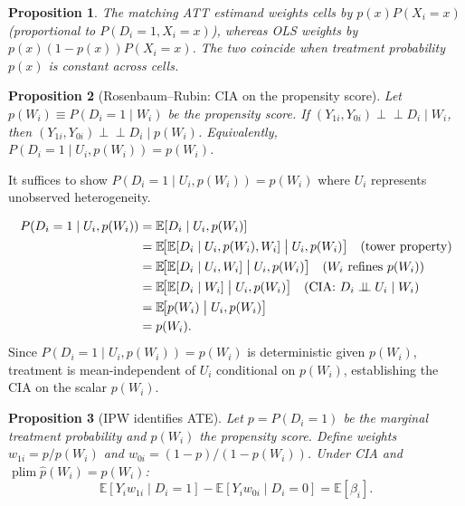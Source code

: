 \documentclass[12pt,a4paper]{article}
\theoremstyle{plain}
\newtheorem{propositio}{Proposition}[section]
\theoremstyle{definition}
\renewenvironment{proof}{\pushQED{\qed}\normalfont}{\popQED\par\nobreak}
\newcommand{\E}{\mathbb{E}}
\newcommand{\plim}{\operatorname{plim}}
\newcommand{\ind}{\perp\!\!\!\perp}
\begin{document}
\begin{propositio}
  The matching ATT estimand weights cells by $p(x)P(X_i=x)$ (proportional to $P(D_i=1,X_i=x)$), whereas OLS weights by $p(x)(1-p(x))P(X_i=x)$.  The two coincide when treatment probability $p(x)$ is constant across cells.
\end{propositio}

\begin{propositio}[Rosenbaum--Rubin: CIA on the propensity score\label{prop:rosenbaum_rubin}]
Let $p(W_i)\equiv P(D_i=1\mid W_i)$ be the propensity score.
If $(Y_{1i},Y_{0i})\ind D_i\mid W_i$, then $(Y_{1i},Y_{0i})\ind D_i\mid p(W_i)$.
Equivalently, $P(D_i=1\mid U_i, p(W_i))=p(W_i)$.
\end{propositio}

\begin{proof}
It suffices to show $P(D_i=1\mid U_i, p(W_i))=p(W_i)$ where $U_i$ represents unobserved heterogeneity.

\begin{align*}
  P(D_i=1\mid U_i, p(W_i))
  &= \E[D_i\mid U_i, p(W_i)] \\
  &= \E\!\bigl[\E[D_i\mid U_i, p(W_i), W_i]\bigm| U_i, p(W_i)\bigr]
     \quad\text{(tower property)}\\
  &= \E\!\bigl[\E[D_i\mid U_i, W_i]\bigm| U_i, p(W_i)\bigr]
     \quad\text{($W_i$ refines $p(W_i)$)}\\
  &= \E\!\bigl[\E[D_i\mid W_i]\bigm| U_i, p(W_i)\bigr]
     \quad\text{(CIA: $D_i\ind U_i\mid W_i$)}\\
  &= \E\!\bigl[p(W_i)\bigm| U_i, p(W_i)\bigr]\\
  &= p(W_i).
\end{align*}
Since $P(D_i=1\mid U_i, p(W_i))=p(W_i)$ is deterministic given $p(W_i)$, treatment is mean-independent of $U_i$ conditional on $p(W_i)$, establishing the CIA on the scalar $p(W_i)$.
\end{proof}

\begin{propositio}[IPW identifies ATE\label{prop:ipw_ate}]
Let $p=P(D_i=1)$ be the marginal treatment probability and $p(W_i)$ the propensity score.
Define weights $w_{1i}=p/p(W_i)$ and $w_{0i}=(1-p)/(1-p(W_i))$.
Under CIA and $\plim\hat p(W_i)=p(W_i)$:
\[
  \E[Y_i w_{1i}\mid D_i=1] - \E[Y_i w_{0i}\mid D_i=0] = \E[\beta_i].
\]
\end{propositio}
\end{document}

